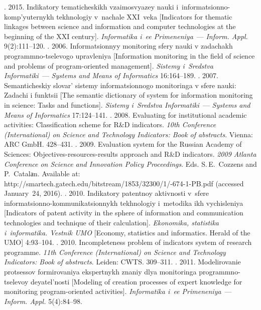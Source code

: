 \begin{multicols}{2}
{{\begin{thebibliography}{99}
. 2015. Indikatory 
tematicheskikh vza\-imo\-svya\-zey nauki i~informatsionno-komp'yuternykh tekh\-no\-lo\-giy 
v~nachale XXI~veka 
[Indicators for thematic linkages between science and information and computer technologies at the 
beginning of the XXI century]. \textit{Informatika i~ee Primeneniya}~--- \textit{Inform. Appl.} 
9(2):111--120.
. 2006. Informatsionnyy monitoring sfery nauki v 
zadachakh programmno-tselevogo upravleniya [Information monitoring in the field of science and 
problems of program-oriented management]. \textit{Sistemy i~Sredstva Informatiki}~--- 
\textit{Systems and Means of Informatics} 16:164--189.
. 2007. Semanti\-che\-skiy slovar' sistemy 
informatsionnogo monitoringa v sfere nauki: Zadachi i funktsii [The semantic dictionary of system for 
information monitoring in science: Tasks and functions]. \textit{Sistemy i~Sredstva 
Informatiki}~--- \textit{Systems and Means of Informatics} 17:124--141.
. 2008. Evaluating for institutional academic activities: 
Classification scheme for R\&D indicators. \textit{10th Conference (International) on Science and 
Technology Indicators: Book of abstracts}. Vienna: ARC GmbH. 428--431.
. 2009. Evaluation system for the Russian Academy of 
Sciences: Objectives-resources-results approach and R\&D indicators. \textit{2009 Atlanta Conference 
on Science and Innovation Policy Proceedings}. Eds. S.\,E.~Cozzens and P.~Catalаn. Available at: 
{\sf http://smartech.gatech.edu/bitstream/1853/32300/1/-674-1-PB.pdf} (accessed January~24, 
2016).
. 2010. Indikatory patentnoy aktivnosti 
v~sfere informatsionno-kommunikatsionnykh tekhnologiy i~metodika ikh vychisleniya [Indicators of 
patent activity in the sphere of information and communication technologies and technique of their 
calculation]. \textit{Ekonomika, statistika i~informatika. Vestnik UMO} [Economy, statistics and 
informatics. Herald of the UMO] 4:93--104.
. 2010. Incompleteness problem of indicators system of research 
programme. \textit{11th Conference (International) on Science and 
Technology Indicators: 
Book of abstracts}. Leiden: CWTS. 309--311.
. 2011. Modelirovanie protsessov formirovaniya 
ekspertnykh znaniy dlya mo\-ni\-to\-rin\-ga programmno-tselevoy deyatel'nosti [Modeling of creation 
processes of expert knowledge for monitoring program-oriented activities]. \textit{Informatika i~ee 
Primeneniya}~--- \textit{Inform. Appl.} 5(4):84--98.


\end{thebibliography}}}
\end{multicols}
